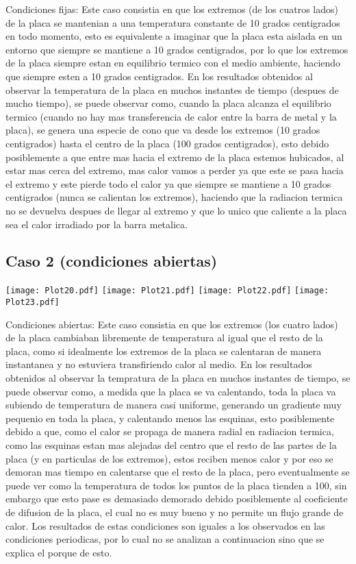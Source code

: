 \documentclass[a4paper,11pt]{article}
\begin{document}
Condiciones fijas: Este caso consistia en que los extremos (de los cuatros lados) de la placa se mantenian a una temperatura constante de 10 grados centigrados en todo momento, esto es equivalente a imaginar que la placa esta aislada en un entorno que siempre se mantiene a 10 grados centigrados, por lo que los extremos de la placa siempre estan en equilibrio termico con el medio ambiente, haciendo que siempre esten a 10 grados centigrados. En los resultados obtenidos al observar la temperatura de la placa en muchos instantes de tiempo (despues de mucho tiempo), se puede observar como, cuando la placa alcanza el equilibrio termico (cuando no hay mas transferencia de calor entre la barra de metal y la placa), se genera una especie de cono que va desde los extremos (10 grados centigrados) hasta el centro de la placa (100 grados centigrados), esto debido posiblemente a que entre mas hacia el extremo de la placa estemos hubicados, al estar mas cerca del extremo, mas calor vamos a perder ya que este se pasa hacia el extremo y este pierde todo el calor ya que siempre se mantiene a 10 grados centigrados (nunca se calientan los extremos), haciendo que la radiacion termica no se devuelva despues de llegar al extremo y que lo unico que caliente a la placa sea el calor irradiado por la barra metalica. 

\subsection{Caso 2 (condiciones abiertas)}

\texttt{[image: Plot20.pdf]}
\texttt{[image: Plot21.pdf]}
\texttt{[image: Plot22.pdf]}
\texttt{[image: Plot23.pdf]}

Condiciones abiertas: Este caso consistia en que los extremos (los cuatro lados) de la placa cambiaban libremente de temperatura al igual que el resto de la placa, como si idealmente los extremos de la placa se calentaran de manera instantanea y no estuviera transfiriendo calor al medio. En los resultados obtenidos al observar la tempratura de la placa en muchos instantes de tiempo, se puede observar como, a medida que la placa se va calentando, toda la placa va subiendo de temperatura de manera casi uniforme, generando un gradiente muy pequenio en toda la placa, y calentando menos las esquinas, esto posiblemente debido a que, como el calor se propaga de manera radial en radiacion termica, como las esquinas estan mas alejadas del centro que el resto de las partes de la placa (y en particulas de los extremos), estos reciben menos calor y por eso se demoran mas tiempo en calentarse que el resto de la placa, pero eventualmente se puede ver como la temperatura de todos los puntos de la placa tienden a 100, sin embargo que esto pase es demasiado demorado debido posiblemente al coeficiente de difusion de la placa, el cual no es muy bueno y no permite un flujo grande de calor. Los resultados de estas condiciones son iguales a los observados en las condiciones periodicas, por lo cual no se analizan a continuacion sino que se explica el porque de esto.
\end{document}
